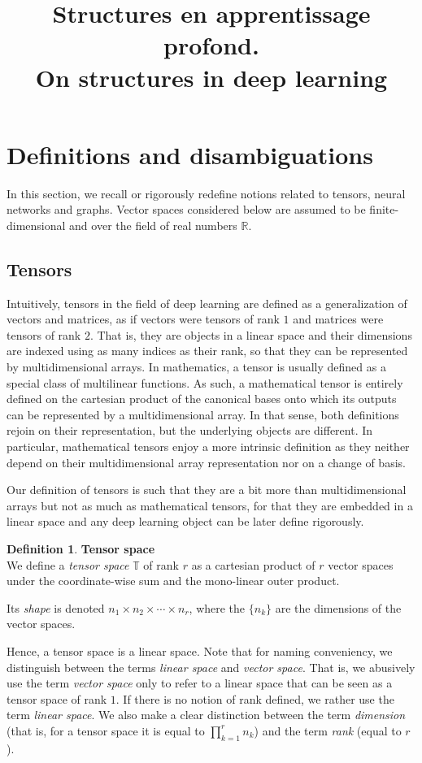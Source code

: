 \documentclass{article}
\title{Structures en apprentissage profond.\\ On structures in deep learning}
\theoremstyle{definition}
\newtheorem{definition}{Definition}[section]
\theoremstyle{remark}
\theoremstyle{plain}
\newcommand{\real}{\mathbb{R}}
\newcommand{\tspace}{\mathbb{T}}
\begin{document}
%
%

\section{Definitions and disambiguations}

In this section, we recall or rigorously redefine notions related to tensors, neural networks and graphs. Vector spaces considered below are assumed to be finite-dimensional and over the field of real numbers $\real$.

\subsection{Tensors}

Intuitively, tensors in the field of deep learning are defined as a generalization of vectors and matrices, as if vectors were tensors of rank $1$ and matrices were tensors of rank $2$. That is, they are objects in a linear space and their dimensions are indexed using as many indices as their rank, so that they can be represented by multidimensional arrays. In mathematics, a tensor is usually defined as a special class of multilinear functions. As such, a mathematical tensor is entirely defined on the cartesian product of the canonical bases onto which its outputs can be represented by a multidimensional array. In that sense, both definitions rejoin on their representation, but the underlying objects are different. In particular, mathematical tensors enjoy a more intrinsic definition as they neither depend on their multidimensional array representation nor on a change of basis.

Our definition of tensors is such that they are a bit more than multidimensional arrays but not as much as mathematical tensors, for that they are embedded in a linear space and any deep learning object can be later define rigorously.

\begin{definition}\textbf{Tensor space}\\
We define a \emph{tensor space} $\tspace$ of rank $r$ as a cartesian product of $r$ vector spaces under the coordinate-wise sum and the mono-linear outer product.

Its \emph{shape} is denoted $n_1 \times n_2 \times \cdots \times n_r$, where the $\{n_k\}$ are the dimensions of the vector spaces.
\end{definition}

Hence, a tensor space is a linear space. Note that for naming conveniency, we distinguish between the terms \emph{linear space} and \emph{vector space}. That is, we abusively use the term \emph{vector space} only to refer to a linear space that can be seen as a tensor space of rank $1$. If there is no notion of rank defined, we rather use the term \emph{linear space}.
We also make a clear distinction between the term \emph{dimension} (that is, for a tensor space it is equal to $\displaystyle \prod_{k=1}^r n_k$) and the term \emph{rank} (equal to $r$).
\end{document}
